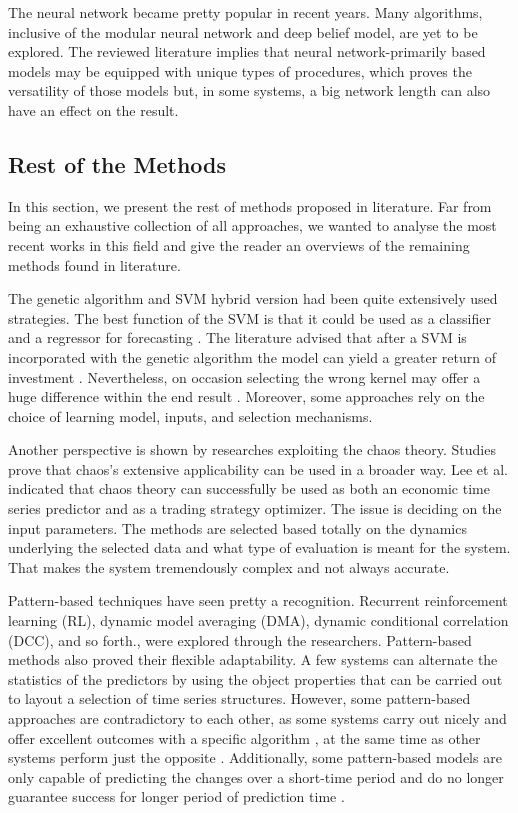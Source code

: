 The neural network became pretty popular in recent years. Many algorithms, inclusive of the modular neural network and deep belief model, are yet to be explored. The reviewed literature implies that neural network-primarily based models may be equipped with unique types of procedures, which proves the versatility of those models but, in some systems, a big network length can also have an effect on the result.

\subsection{Rest of the Methods}
In this section, we present the rest of methods proposed in literature. Far from being an exhaustive collection of all approaches, we wanted to analyse the most recent works in this field and give the reader an overviews of the remaining methods found in literature.

The genetic algorithm and SVM hybrid version had been quite extensively used strategies. The best function of the SVM is that it could be used as a classifier \cite{58} and a regressor for forecasting \cite{59}. The literature advised that after a SVM is incorporated with the genetic algorithm the model can yield a greater return of investment \cite{58}. Nevertheless, on occasion selecting the wrong kernel may offer a huge difference within the end result \cite{59}. Moreover, some approaches rely on the choice of learning model, inputs, and selection mechanisms.

Another perspective is shown by researches exploiting the chaos theory. Studies prove that chaos's extensive applicability can be used in a broader way. Lee et al. \cite{Lee19} indicated that chaos theory can successfully be used as both an economic time series predictor and as a trading strategy optimizer. The issue is deciding on the input parameters. The methods are selected based totally on the dynamics underlying the selected data and what type of evaluation is meant for the system. That makes the system tremendously complex and not always accurate.

Pattern-based techniques have seen pretty a recognition. Recurrent reinforcement learning (RL), dynamic model averaging (DMA), dynamic conditional correlation (DCC), and so forth., were explored through the researchers. Pattern-based methods also proved their flexible adaptability. A few systems can alternate the statistics of the predictors by using the object properties \cite{BARTOS201757} that can be carried out to layout a selection of time series structures. However, some pattern-based approaches are contradictory to each other, as some systems carry out nicely and offer excellent outcomes with a specific algorithm \cite{8376549}, at the same time as other systems perform just the opposite \cite{CONTRERAS20181}. Additionally, some pattern-based models are only capable of predicting the changes over a short-time period and do no longer guarantee success for longer period of prediction time \cite{WILINSKI2019163}.

